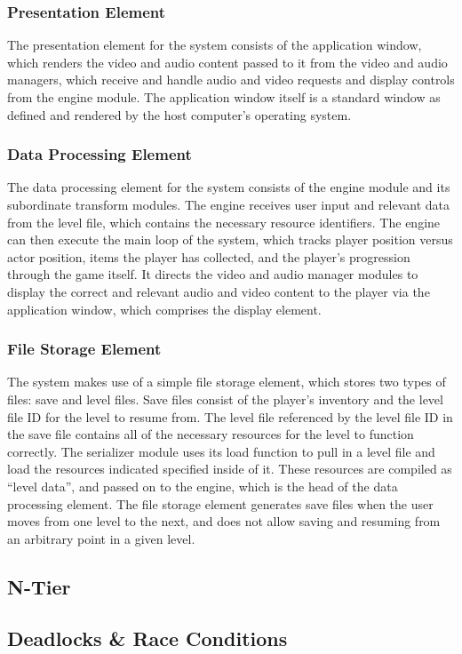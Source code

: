 \documentclass{article}
\begin{document}
		\subsubsection{Presentation Element}
			The presentation element for the system consists of the application window, which renders the video and audio content passed to it from the video and audio managers, which receive and handle audio and video requests and display controls from the engine module. The application window itself is a standard window as defined and rendered by the host computer's operating system. 
		\subsubsection{Data Processing Element}
			The data processing element for the system consists of the engine module and its subordinate transform modules. The engine receives user input and relevant data from the level file, which contains the necessary resource identifiers. The engine can then execute the main loop of the system, which tracks player position versus actor position, items the player has collected, and the player's progression through the game itself. It directs the video and audio manager modules to display the correct and relevant audio and video content to the player via the application window, which comprises the display element. 
		\subsubsection{File Storage Element}
			 The system makes use of a simple file storage element, which stores two types of files: save and level files. Save files consist of the player's inventory and the level file ID for the level to resume from. The level file referenced by the level file ID in the save file contains all of the necessary resources for the level to function correctly. The serializer module uses its load function to pull in a level file and load the resources indicated specified inside of it. These resources are compiled as ``level data'', and passed on to the engine, which is the head of the data processing element. The file storage element generates save files when the user moves from one level to the next, and does not allow saving and resuming from an arbitrary point in a given level. 
	\subsection{N-Tier}
	\subsection{Deadlocks \& Race Conditions}
\end{document}
